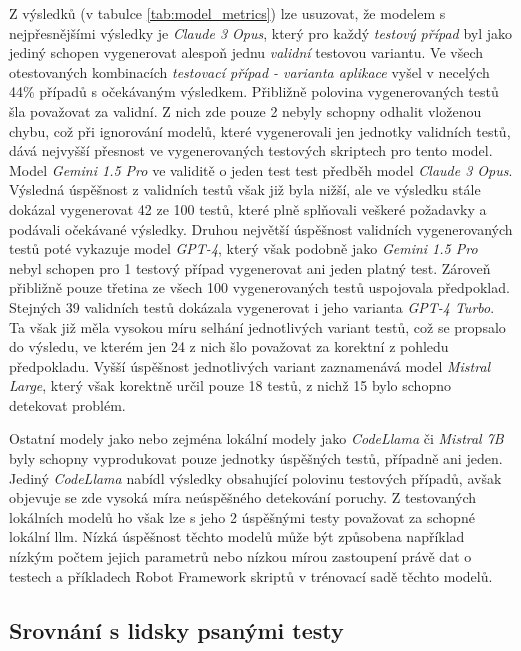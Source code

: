 \documentclass[czech, ma, kiv, he, iso690alph, pdf, viewonly]{fasthesis}
\begin{document}
        Z výsledků (v tabulce \ref{tab:model_metrics}) lze usuzovat, že modelem s nejpřesnějšími výsledky je \textit{Claude 3 Opus}, který pro každý \textit{testový případ} byl jako jediný schopen vygenerovat alespoň jednu \textit{validní} testovou variantu. Ve všech otestovaných kombinacích \textit{testovací případ - varianta aplikace} vyšel v necelých 44\% případů s očekávaným výsledkem. Přibližně polovina vygenerovaných testů šla považovat za validní. Z nich zde pouze 2 nebyly schopny odhalit vloženou chybu, což při ignorování modelů, které vygenerovali jen jednotky validních testů, dává nejvyšší přesnost ve vygenerovaných testových skriptech pro tento model. Model \textit{Gemini 1.5 Pro} ve validitě o jeden test test předběh model \textit{Claude 3 Opus}. Výsledná úspěšnost z validních testů však již byla nižší, ale ve výsledku stále dokázal vygenerovat 42 ze 100 testů, které plně splňovali veškeré požadavky a podávali očekávané výsledky. Druhou největší úspěšnost validních vygenerovaných testů poté vykazuje model \textit{GPT-4}, který však podobně jako \textit{Gemini 1.5 Pro} nebyl schopen pro 1 testový případ vygenerovat ani jeden platný test. Zároveň přibližně pouze třetina ze všech 100 vygenerovaných testů uspojovala předpoklad. Stejných 39 validních testů dokázala vygenerovat i jeho varianta \textit{GPT-4 Turbo}. Ta však již měla vysokou míru selhání jednotlivých variant testů, což se propsalo do výsledu, ve kterém jen 24 z nich šlo považovat za korektní z pohledu předpokladu. Vyšší úspěšnost jednotlivých variant zaznamenává model \textit{Mistral Large}, který však korektně určil pouze 18 testů, z nichž 15 bylo schopno detekovat problém.

        Ostatní modely jako  nebo zejména lokální modely jako \textit{CodeLlama} či \textit{Mistral 7B} byly schopny vyprodukovat pouze jednotky úspěšných testů, případně ani jeden. Jediný \textit{CodeLlama} nabídl výsledky obsahující polovinu testových případů, avšak objevuje se zde vysoká míra neúspěšného detekování poruchy. Z testovaných lokálních modelů ho však lze s jeho 2 úspěšnými testy považovat za schopné lokální \Gls{llm}. Nízká úspěšnost těchto modelů může být způsobena například nízkým počtem jejich parametrů nebo nízkou mírou zastoupení právě dat o testech a příkladech Robot Framework skriptů v trénovací sadě těchto modelů.

        \subsection{Srovnání s lidsky psanými testy}
\end{document}
